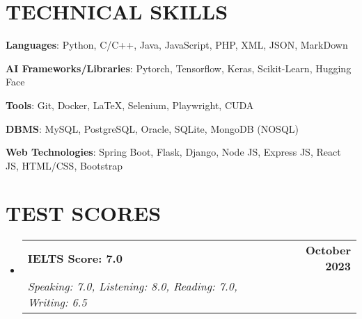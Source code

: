 \documentclass[letterpaper,10.5pt]{article}
\makeatletter
\newcommand{\resumeSubheading}[4]{
  \vspace{-2pt}\item
    \begin{tabular*}{1.0\textwidth}[t]{l@{\extracolsep{\fill}}r}
      \textbf{#1} & \textbf{\small #2} \\
      \textit{\small#3} & \textit{\small #4} \\
    \end{tabular*}\vspace{-7pt}
}
\newcommand{\resumeSubHeadingListStart}{\begin{itemize}[leftmargin=0.0in, label={}]}
\newcommand{\resumeSubHeadingListEnd}{\end{itemize}}
\makeatother
\begin{document}
\begin{itemize}[leftmargin=0in, label={}, parsep=-2pt]
\end{itemize}
\vspace{-16pt}


\section{TECHNICAL SKILLS}
\begin{itemize}[leftmargin=0in, label={}, parsep=-2pt]
  \small{\item{
                \textbf{Languages}{: Python, C/C++, Java, JavaScript, PHP, XML, JSON, MarkDown}}
    \item{\textbf{AI Frameworks/Libraries}{: Pytorch, Tensorflow, Keras, Scikit-Learn, Hugging Face}}
    \item{\textbf{Tools}{: Git, Docker, \LaTeX, Selenium, Playwright, CUDA}}
    \item{\textbf{DBMS}{: MySQL, PostgreSQL, Oracle, SQLite, MongoDB (NOSQL)}}
    \item{\textbf{Web Technologies}{: Spring Boot, Flask, Django, Node JS, Express JS, React JS, HTML/CSS, Bootstrap}}
  }
\end{itemize}
\vspace{-16pt}



\vspace{0pt}

\section{TEST SCORES}
\resumeSubHeadingListStart
\resumeSubheading
{IELTS Score: 7.0}{October 2023}
{Speaking: 7.0, Listening: 8.0, Reading: 7.0, Writing: 6.5}{}
\resumeSubHeadingListEnd
\vspace{-8pt}
\end{document}
